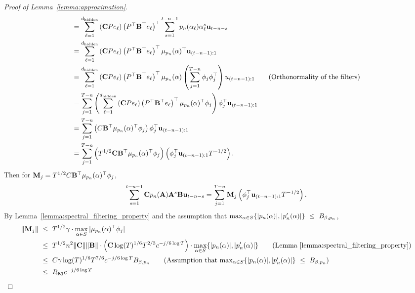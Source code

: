 \begin{proof}[Proof of Lemma~\ref{lemma:approximation}]
\begin{align*}
  & = \sum_{\ell=1}^{d_{\textrm{hidden}}}  \left( \mathbf{C} P  e_{\ell} \right)  
   \left( P^{\top} \mathbf{B}^{\top}  e_{\ell} \right)^{\top} \sum_{s = 1}^{t-n-1} p_n(\alpha_{\ell}) \alpha_{\ell}^s \mathbf u_{t-n-s} \\
   & = \sum_{\ell=1}^{d_{\textrm{hidden}}}  \left( \mathbf{C} P  e_{\ell} \right)  
   \left( P^{\top} \mathbf{B}^{\top}  e_{\ell} \right)^{\top} \mu_{p_n}(\alpha)^{\top} \mathbf u_{(t-n-1):1} \\
   & = \sum_{\ell=1}^{d_{\textrm{hidden}}}  \left( \mathbf{C} P  e_{\ell} \right)  
   \left( P^{\top} \mathbf{B}^{\top}  e_{\ell} \right)^{\top} \mu_{p_n}(\alpha) \left( \sum_{j = 1}^{T-n} \phi_j \phi_j^{\top} \right)u_{(t-n-1):1} \tag{Orthonormality of the filters} \\
   & = \sum_{j = 1}^{T-n} \left( \sum_{\ell=1}^{d_{\textrm{hidden}}}  \left( \mathbf{C} P  e_{\ell} \right)  
   \left( P^{\top} \mathbf{B}^{\top}  e_{\ell} \right)^{\top} \mu_{p_n}(\alpha)^{\top} \phi_j \right) \phi_j^{\top} \mathbf u_{(t-n-1):1} \\
   & = \sum_{j = 1}^{T-n} \left(  C\mathbf{B}^{\top} \mu_{p_n}(\alpha)^{\top} \phi_j \right) \phi_j^{\top} \mathbf u_{(t-n-1):1} \\
   & =  \sum_{j = 1}^{T-n} \left(  T^{1/2} \mathbf{C} \mathbf{B}^{\top} \mu_{p_n}(\alpha)^{\top} \phi_j \right) \left( \phi_j^{\top} \mathbf u_{(t-n-1):1} T^{-1/2} \right) .
\end{align*}
Then for $\mathbf{M}_j =  T^{1/2} C\mathbf{B}^{\top} \mu_{p_n}(\alpha)^{\top} \phi_j$,
\begin{align*}
    \sum_{s = 1}^{t-n-1} \mathbf{C} p_n(\mathbf{A}) \mathbf{A}^s \mathbf{B} \mathbf u_{t-n-s}= \sum_{j = 1}^{T-n} \mathbf{M}_j \left( \phi_j^{\top} \mathbf u_{(t-n-1):1} T^{-1/2} \right) .
\end{align*}
By Lemma~\ref{lemma:spectral_filtering_property} and the assumption that $\max_{\alpha \in S} \{ |p_n(\alpha)|, |p_n'(\alpha)| \} ~\le~ B_{\beta, p_n}$,
\begin{align*}
    \norm{\M_j}& \leq T^{1/2} \gamma\cdot \max_{\alpha \in S} \abs{\mu_{p_n}(\alpha)^{\top} \phi_j} \\
    & \leq  T^{1/2} n^2 \norm{\C}  \norm{\B} \cdot \left( \C\log(T)^{1/6}  T^{2/3} c^{-j/6 \log T} \right) \cdot \max_{\alpha \in S} \{ \abs{p_n(\alpha)}, \abs{p_n'(\alpha)} \} \tag{Lemma~\ref{lemma:spectral_filtering_property}}\\
    & \leq C \gamma \log(T)^{1/6} T^{7/6}  c^{-j/6 \log T} \pbnd \tag{Assumption that $\max_{\alpha \in S} \{ \abs{p_n(\alpha)}, \abs{p_n'(\alpha)} \} \leq \pbnd$} \\
    & \leq R_\M  c^{-j/6 \log T} \\

\end{align*}
\end{proof}
